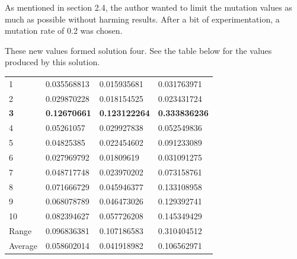 \documentclass[sigconf]{acmart}
\begin{document}
As mentioned in section 2.4, the author wanted to limit the mutation values as much as possible without harming results. After a bit of experimentation, a mutation rate of 0.2 was chosen.

These new values formed solution four. See the table below for the values produced by this solution.

%
%
\begin{supertabular}{p{0.1\columnwidth}p{0.25\columnwidth}p{0.25\columnwidth}p{0.25\columnwidth}}
    1&0.035568813&0.015935681&0.031763971\\
    2&0.029870228&0.018154525&0.023431724\\
    \textbf{3}&\textbf{0.12670661}&\textbf{0.123122264}&\textbf{0.333836236}\\
    4&0.05261057&0.029927838&0.052549836\\
    5&0.04825385&0.022454602&0.091233089\\
    6&0.027969792&0.01809619&0.031091275\\
    7&0.048717748&0.023970202&0.073158761\\
    8&0.071666729&0.045946377&0.133108958\\
    9&0.068078789&0.046473026&0.129392741\\
    10&0.082394627&0.057726208&0.145349429\\
    Range&0.096836381&0.107186583&0.310404512\\
    Average&0.058602014&0.041918982&0.106562971\\
    
\end{supertabular}%
\\
\end{document}
